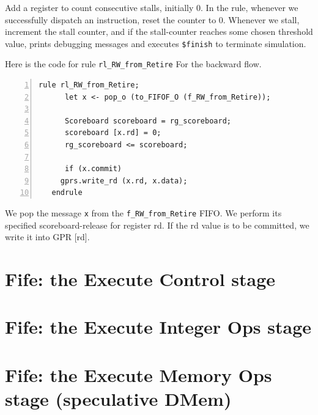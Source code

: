 Add a register to count consecutive stalls, initially 0.  In the rule,
whenever we successfully dispatch an instruction, reset the counter to
0.  Whenever we stall, increment the stall counter, and if the
stall-counter reaches some chosen threshold value, prints debugging
messages and executes \verb|$finish| to terminate simulation.

\Endexercise

Here is the code for rule \verb|rl_RW_from_Retire| For the backward
flow.

{\small
\begin{Verbatim}[frame=single, numbers=left, label=(In file:src\_Fife/S3\_RR\_RW.bsv)]
   rule rl_RW_from_Retire;
      let x <- pop_o (to_FIFOF_O (f_RW_from_Retire));

      Scoreboard scoreboard = rg_scoreboard;
      scoreboard [x.rd] = 0;
      rg_scoreboard <= scoreboard;

      if (x.commit)
	 gprs.write_rd (x.rd, x.data);
   endrule
\end{Verbatim}
}

We pop the message \verb|x| from the \verb|f_RW_from_Retire| FIFO.  We
perform its specified scoreboard-release for register rd.  If the rd
value is to be committed, we write it into GPR [rd].


\section{Fife: the Execute Control stage}

\label{Sec_Fife_Control_stage}


\section{Fife: the Execute Integer Ops stage}

\label{Sec_Fife_IALU_stage}


\section{Fife: the Execute Memory Ops stage (speculative DMem)}

\label{Sec_Fife_DMem_stage}

